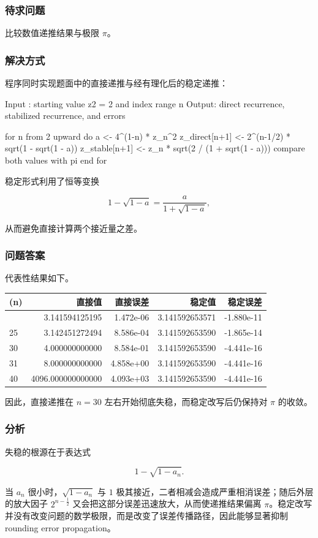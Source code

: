 \documentclass[12pt,a4paper,fontset=none]{ctexart}
\newcommand{\blocktitle}[1]{\subsubsection{#1}}
\newcounter{none}
\begin{document}
\blocktitle{待求问题}

比较数值递推结果与极限 \(\pi\)。

\blocktitle{解决方式}

程序同时实现题面中的直接递推与经有理化后的稳定递推：

\begin{CodeBlock}
Input : starting value z2 = 2 and index range n
Output: direct recurrence, stabilized recurrence, and errors

for n from 2 upward do
    a <- 4^(1-n) * z_n^2
    z_direct[n+1] <- 2^(n-1/2) * sqrt(1 - sqrt(1 - a))
    z_stable[n+1] <- z_n * sqrt(2 / (1 + sqrt(1 - a)))
    compare both values with pi
end for
\end{CodeBlock}

稳定形式利用了恒等变换

\[
1-\sqrt{1-a}=\frac{a}{1+\sqrt{1-a}},
\]

从而避免直接计算两个接近量之差。

\blocktitle{问题答案}

代表性结果如下。

{\def\LTcaptype{none} %
\begin{longtable}[]{@{}lrrrr@{}}
\toprule\noalign{}
(n) & 直接值 & 直接误差 & 稳定值 & 稳定误差 \\
\midrule\noalign{}
\endhead
\bottomrule\noalign{}
\endlastfoot
20 & 3.141594125195 & 1.472e-06 & 3.141592653571 & -1.880e-11 \\
25 & 3.142451272494 & 8.586e-04 & 3.141592653590 & -1.865e-14 \\
30 & 4.000000000000 & 8.584e-01 & 3.141592653590 & -4.441e-16 \\
31 & 8.000000000000 & 4.858e+00 & 3.141592653590 & -4.441e-16 \\
40 & 4096.000000000000 & 4.093e+03 & 3.141592653590 & -4.441e-16 \\
\end{longtable}
}

因此，直接递推在 \(n=30\) 左右开始彻底失稳，而稳定改写后仍保持对 \(\pi\) 的收敛。

\blocktitle{分析}

失稳的根源在于表达式

\[
1-\sqrt{1-a_n}.
\]

当 \(a_n\) 很小时，\(\sqrt{1-a_n}\) 与 \(1\) 极其接近，二者相减会造成严重相消误差；随后外层的放大因子 \(2^{n-\frac12}\) 又会把这部分误差迅速放大，从而使递推结果偏离 \(\pi\)。稳定改写并没有改变问题的数学极限，而是改变了误差传播路径，因此能够显著抑制 rounding error propagation。
\end{document}
